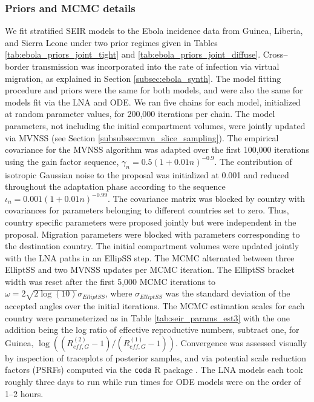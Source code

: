 \subsubsection{Priors and MCMC details}
\label{subsubsec:ebola_joint_mcmc}

We fit stratified SEIR models to the Ebola incidence data from Guinea, Liberia, and Sierra Leone under two prior regimes given in Tables \ref{tab:ebola_priors_joint_tight} and \ref{tab:ebola_priors_joint_diffuse}. Cross--border transmission was incorporated into the rate of infection via virtual migration, as explained in Section \ref{subsec:ebola_synth}.  The model fitting procedure and priors were the same for both models, and were also the same for models fit via the LNA and ODE. We ran five chains for each model, initialized at random parameter values, for 200,000 iterations per chain. The model parameters, not including the initial compartment volumes, were jointly updated via MVNSS (see Section \ref{subsubsec:mvn_slice_sampling}). The empirical covariance for the MVNSS algorithm was adapted over the first 100,000 iterations using the gain factor sequence, $\gamma_n = 0.5(1 + 0.01n)^{-0.9}$. The contribution of isotropic Gaussian noise to the proposal was initialized at 0.001 and reduced throughout the adaptation phase according to the sequence $ \iota_n = 0.001(1 + 0.01n)^{-0.99} $. The covariance matrix was blocked by country with covariances for parameters belonging to different countries set to zero. Thus, country specific parameters were proposed jointly but were independent in the proposal. Migration parameters were blocked with parameters corresponding to the destination country. The initial compartment volumes were updated jointly with the LNA paths in an EllipSS step. The MCMC alternated between three ElliptSS and two MVNSS updates per MCMC iteration. The ElliptSS bracket width was reset after the first 5,000 MCMC iterations to $ \omega = 2\sqrt{2\log(10)}\sigma_{ElliptSS}$, where $ \sigma_{ElliptSS} $ was the standard deviation of the accepted angles over the initial iterations. The MCMC estimation scales for each country were parameterized as in Table \ref{tab:seir_params_est3} with the one addition being the log ratio of effective reproductive numbers, subtract one, for Guinea, $ \log\left ((R_{eff,G}^{(2)}-1)/(R_{eff,G}^{(1)}-1)\right ) $. Convergence was assessed visually by inspection of traceplots of posterior samples, and via potential scale reduction factors (PSRFs) \cite{brooks1998general} computed via the \texttt{coda} R package \cite{codapackage}. The LNA models each took roughly three days to run while run times for ODE models were on the order of 1--2 hours. 

